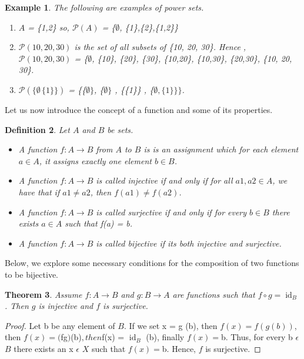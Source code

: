 \documentclass[12pt, a4paper]{article}
\theoremstyle{plain}
\newtheorem{theorem}{Theorem}[section]
\newtheorem{definition}[theorem]{Definition}
\newtheorem{example}[theorem]{Example}
\DeclareMathOperator*{\id}{id}
\begin{document}
\begin{example}\rm The following are examples of power sets. 
\begin{enumerate}
    \item $A$ = \{1,2\} so, $\mathcal{P}(A)$ = \{$\emptyset$, \{1\},\{2\},\{1,2\}\} 
    \item $\mathcal{P}(10, 20, 30)$ is the set of all subsets of \{10, 20, 30\}. Hence , $\mathcal{P}(10,20,30)$ = \{$\emptyset$, \{10\}, \{20\}, \{30\}, \{10,20\}, \{10,30\}, \{20,30\}, \{10, 20, 30\}.
    \item $\mathcal{P}(\{\emptyset\,\{1\}\})$ = \{\{$\emptyset\}$, \{$\emptyset\}$ , \{\{1\}\} , \{$\emptyset,\{1\}\}\}$.
\end{enumerate}
\end{example}

Let us now introduce the concept of a function and some of its properties.

\begin{definition}\rm Let $A$ and $B$ be sets.
\begin{itemize}
    \item A \textit{function} $f:A\to B$ from $A$ to $B$ is is an assignment which
for each element $ a \in A$, it assigns exactly one element $b \in B$. 
    
    \item A function $f:A\to B$ is called \textit{injective} if and only if for all $a1, a2 \in A$, we have
that if $a1 \neq a2$, then $f(a1) \neq f(a2)$.
    
    \item  A function $f:A\to B$ is called \textit{surjective} if and only if for every $b \in B$ there exists $a \in A $ such that f(a) = b. 
    
    \item  A function $f:A\to B$ is called \textit{bijective} if its both injective and surjective.
\end{itemize}
\end{definition}

Below, we explore some necessary conditions for the composition of two functions to be bijective. 

\begin{theorem}
Assume $f:A\rightarrow B$ and $g:B\rightarrow A$ are functions such that $f\circ g=\id_B$. Then $g$ is injective and $f$ is surjective.
\end{theorem}

\begin{proof} 

Let b be any element of $B$. If we set x = g (b), then 
                $f(x) = f(g(b))$, then  
                $f(x) = ($f\circ g$) $(b)$ ,then $f(x) = $\id_B$ (b)$ $, finally
                $f(x) = $b$ $.
Thus, for every b $\epsilon$ $B$ there exists an x $\epsilon$ $X$ such that $f(x) = $b$ $. Hence, $f$ is surjective. 

\end{proof}
\end{document}
